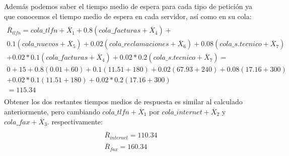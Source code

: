 Además podemos saber el tiempo medio de espera para cada tipo de petición ya que conocemos el tiempo medio de espera en cada servidor, así como en su cola:
\begin{multline}\\
\overline{R}_{tlfn} = cola\_tlfn + \overline{X}_{1} + 0.8(cola\_facturas+\overline{X}_{4}) +\\ 0.1(cola\_nuevos+\overline{X}_{5}) + 0.02(cola\_reclamaciones+\overline{X}_{6}) + 0.08(cola\_s.tecnico+\overline{X}_{7})\\ + 0.02*0.1(cola\_facturas+\overline{X}_{4}) + 0.02*0.2(cola\_s.tecnico+\overline{X}_{7}) =\\
0+15+0.8(0.01+60)+ 0.1(11.51+180) + 0.02(67.93+240) + 0.08(17.16+300) \\+ 0.02*0.1(11.51+180) + 0.02*0.2(17.16+300)\\
=115.34 \\
\end{multline}
Obtener los dos restantes tiempos medios de respuesta es similar al calculado anteriormente, pero cambiando $cola\_tlfn + \overline{X}_{1}$ por $cola\_internet + \overline{X}_{2}$ y $cola\_fax + \overline{X}_{3}$. respectivamente:
\begin{multline}\\
\overline{R}_{internet} = 110.34 \\
\overline{R}_{fax} = 160.34 \\
\end{multline}